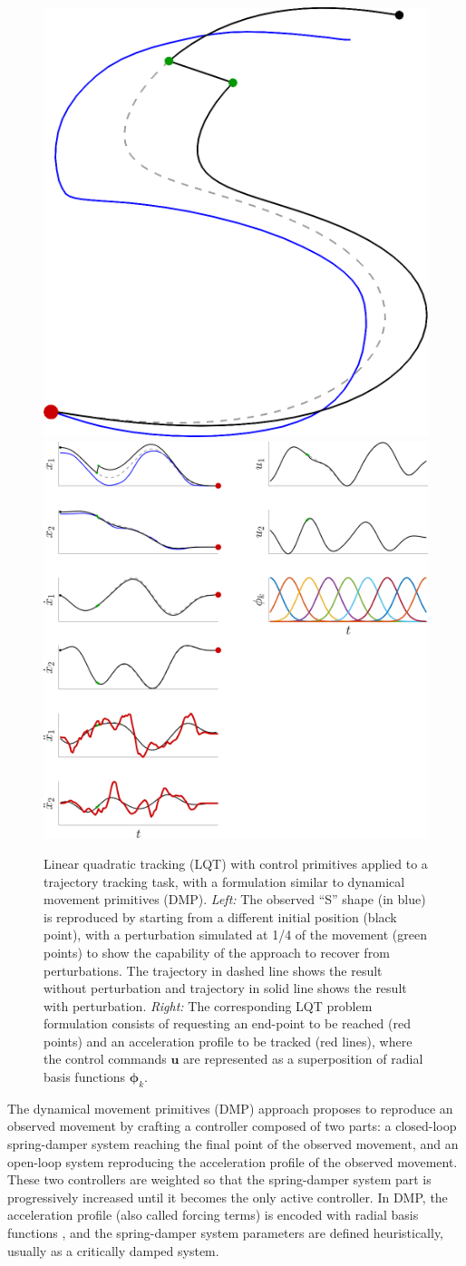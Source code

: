 \documentclass[10pt,a4paper]{article} %
\begin{document}
\begin{figure}
\centering
\includegraphics[width=.35\textwidth]{images/LQT_CP_DMP01.png}\hspace{6mm}
\includegraphics[width=.4\textwidth]{images/LQT_CP_DMP02.png}
\caption{\footnotesize
Linear quadratic tracking (LQT) with control primitives applied to a trajectory tracking task, with a formulation similar to dynamical movement primitives (DMP).
\emph{Left:} The observed ``S'' shape (in blue) is reproduced by starting from a different initial position (black point), with a perturbation simulated at 1/4 of the movement (green points) to show the capability of the approach to recover from perturbations. The trajectory in dashed line shows the result without perturbation and trajectory in solid line shows the result with perturbation.
\emph{Right:} The corresponding LQT problem formulation consists of requesting an end-point to be reached (red points) and an acceleration profile to be tracked (red lines), where the control commands $\bm{u}$ are represented as a superposition of radial basis functions $\bm{\phi}_k$.
}
\label{fig:LQT_CP_DMP}
\end{figure}

The dynamical movement primitives (DMP) \cite{Ijspeert13} approach proposes to reproduce an observed movement by crafting a controller composed of two parts: a closed-loop spring-damper system reaching the final point of the observed movement, and an open-loop system reproducing the acceleration profile of the observed movement. These two controllers are weighted so that the spring-damper system part is progressively increased until it becomes the only active controller. In DMP, the acceleration profile (also called forcing terms) is encoded with radial basis functions \cite{Broomhead88}, and the spring-damper system parameters are defined heuristically, usually as a critically damped system.
\end{document}
